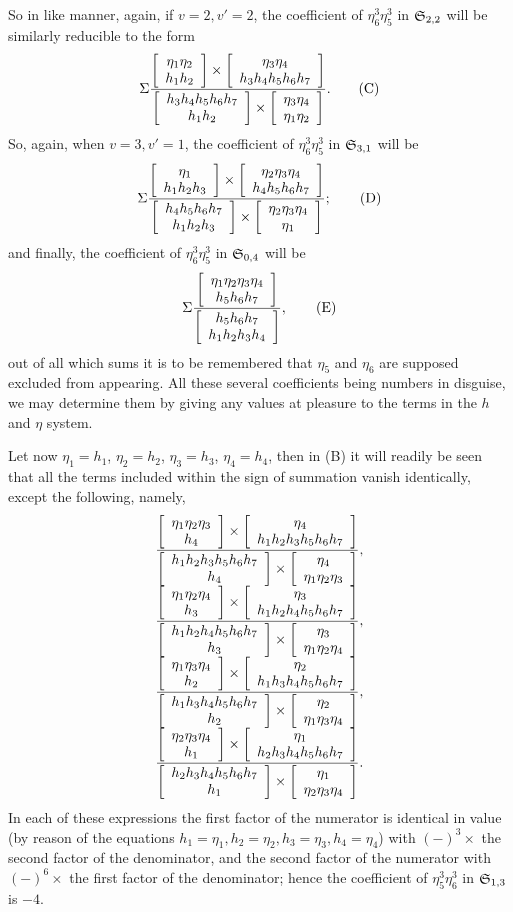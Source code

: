 \documentclass[11pt]{article}
\newcommand{\sourcepage}[1]{\marginpar{\scriptsize p.~#1}}
\begin{document}
So in like manner, again, if $v=2,v'=2$, the coefficient of $\eta_6^3\eta_5^3$ in $\mathfrak{S}_{2,2}$ will be similarly reducible to the form
\[
\Sigma\frac{
\left[\begin{array}{c}\eta_1\eta_2\\h_1h_2\end{array}\right]\times\left[\begin{array}{c}\eta_3\eta_4\\h_3h_4h_5h_6h_7\end{array}\right]
}{
\left[\begin{array}{c}h_3h_4h_5h_6h_7\\h_1h_2\end{array}\right]\times\left[\begin{array}{c}\eta_3\eta_4\\\eta_1\eta_2\end{array}\right]
}.\tag{C}
\]
So, again, when $v=3,v'=1$, the coefficient of $\eta_6^3\eta_5^3$ in $\mathfrak{S}_{3,1}$ will be
\[
\Sigma\frac{
\left[\begin{array}{c}\eta_1\\h_1h_2h_3\end{array}\right]\times\left[\begin{array}{c}\eta_2\eta_3\eta_4\\h_4h_5h_6h_7\end{array}\right]
}{
\left[\begin{array}{c}h_4h_5h_6h_7\\h_1h_2h_3\end{array}\right]\times\left[\begin{array}{c}\eta_2\eta_3\eta_4\\\eta_1\end{array}\right]
};\tag{D}
\]
and finally, the coefficient of $\eta_6^3\eta_5^3$ in $\mathfrak{S}_{0,4}$ will be
\[
\Sigma\frac{
\left[\begin{array}{c}\eta_1\eta_2\eta_3\eta_4\\h_5h_6h_7\end{array}\right]
}{
\left[\begin{array}{c}h_5h_6h_7\\h_1h_2h_3h_4\end{array}\right]
},\tag{E}
\]
out of all which sums it is to be remembered that $\eta_5$ and $\eta_6$ are supposed excluded from appearing. All these several coefficients being numbers in disguise, we may determine them by giving any values at pleasure to the terms in the $h$ and $\eta$ system.

\sourcepage{473}
Let now $\eta_1=h_1$, $\eta_2=h_2$, $\eta_3=h_3$, $\eta_4=h_4$, then in (B) it will readily be seen that all the terms included within the sign of summation vanish identically, except the following, namely,
\begingroup\scriptsize
\[
\begin{array}{c}
\displaystyle
\frac{\left[\begin{array}{c}\eta_1\eta_2\eta_3\\h_4\end{array}\right]\times\left[\begin{array}{c}\eta_4\\h_1h_2h_3h_5h_6h_7\end{array}\right]}{\left[\begin{array}{c}h_1h_2h_3h_5h_6h_7\\h_4\end{array}\right]\times\left[\begin{array}{c}\eta_4\\\eta_1\eta_2\eta_3\end{array}\right]},\\[1.1em]
\displaystyle
\frac{\left[\begin{array}{c}\eta_1\eta_2\eta_4\\h_3\end{array}\right]\times\left[\begin{array}{c}\eta_3\\h_1h_2h_4h_5h_6h_7\end{array}\right]}{\left[\begin{array}{c}h_1h_2h_4h_5h_6h_7\\h_3\end{array}\right]\times\left[\begin{array}{c}\eta_3\\\eta_1\eta_2\eta_4\end{array}\right]},\\[1.1em]
\displaystyle
\frac{\left[\begin{array}{c}\eta_1\eta_3\eta_4\\h_2\end{array}\right]\times\left[\begin{array}{c}\eta_2\\h_1h_3h_4h_5h_6h_7\end{array}\right]}{\left[\begin{array}{c}h_1h_3h_4h_5h_6h_7\\h_2\end{array}\right]\times\left[\begin{array}{c}\eta_2\\\eta_1\eta_3\eta_4\end{array}\right]},\\[1.1em]
\displaystyle
\frac{\left[\begin{array}{c}\eta_2\eta_3\eta_4\\h_1\end{array}\right]\times\left[\begin{array}{c}\eta_1\\h_2h_3h_4h_5h_6h_7\end{array}\right]}{\left[\begin{array}{c}h_2h_3h_4h_5h_6h_7\\h_1\end{array}\right]\times\left[\begin{array}{c}\eta_1\\\eta_2\eta_3\eta_4\end{array}\right]}.
\end{array}
\]
\endgroup
In each of these expressions the first factor of the numerator is identical in value (by reason of the equations $h_1=\eta_1,h_2=\eta_2,h_3=\eta_3,h_4=\eta_4$) with $(-)^3\times$ the second factor of the denominator, and the second factor of the numerator with $(-)^6\times$ the first factor of the denominator; hence the coefficient of $\eta_5^3\eta_6^3$ in $\mathfrak{S}_{1,3}$ is $-4$.
\end{document}
